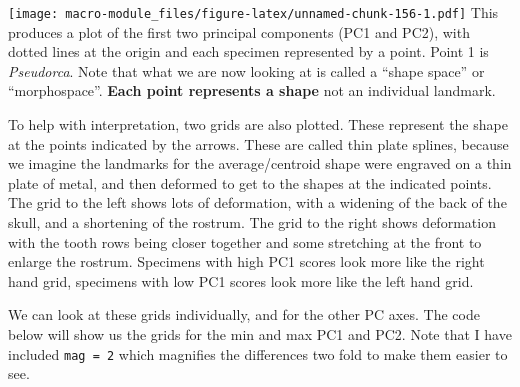 \documentclass[]{book}
\newenvironment{Shaded}{\begin{snugshade}}{\end{snugshade}}
\newcommand{\KeywordTok}[1]{\textcolor[rgb]{0.13,0.29,0.53}{\textbf{{#1}}}}
\newcommand{\DataTypeTok}[1]{\textcolor[rgb]{0.13,0.29,0.53}{{#1}}}
\newcommand{\StringTok}[1]{\textcolor[rgb]{0.31,0.60,0.02}{{#1}}}
\newcommand{\OtherTok}[1]{\textcolor[rgb]{0.56,0.35,0.01}{{#1}}}
\newcommand{\NormalTok}[1]{{#1}}
\theoremstyle{definition}
\theoremstyle{definition}
\theoremstyle{definition}
\theoremstyle{remark}
\begin{document}
\begin{Shaded}
\end{Shaded}

\texttt{[image: macro-module\_files/figure-latex/unnamed-chunk-156-1.pdf]}
This produces a plot of the first two principal components (PC1 and
PC2), with dotted lines at the origin and each specimen represented by a
point. Point 1 is \emph{Pseudorca}. Note that what we are now looking at
is called a ``shape space'' or ``morphospace''. \textbf{Each point
represents a shape} not an individual landmark.

To help with interpretation, two grids are also plotted. These represent
the shape at the points indicated by the arrows. These are called thin
plate splines, because we imagine the landmarks for the average/centroid
shape were engraved on a thin plate of metal, and then deformed to get
to the shapes at the indicated points. The grid to the left shows lots
of deformation, with a widening of the back of the skull, and a
shortening of the rostrum. The grid to the right shows deformation with
the tooth rows being closer together and some stretching at the front to
enlarge the rostrum. Specimens with high PC1 scores look more like the
right hand grid, specimens with low PC1 scores look more like the left
hand grid.

We can look at these grids individually, and for the other PC axes. The
code below will show us the grids for the min and max PC1 and PC2. Note
that I have included \texttt{mag\ =\ 2} which magnifies the differences
two fold to make them easier to see.
\end{document}

